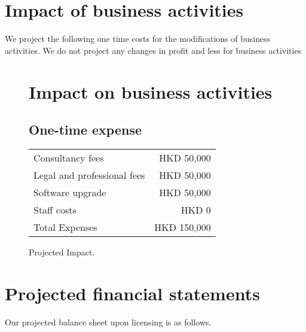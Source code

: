 \section{Impact of business activities}

We project the following one time costs for the modifications of
business activities.  We do not project any changes in profit and less
for business activities

\begin{figure}[h]
  \centering
  \caption{Projected Impact.}
  \label{fig:financial_statement}
  
  \section*{Impact on business activities}
  
  \subsection*{One-time expense}
  \begin{tabular}{lr}
    Consultancy fees & HKD 50,000 \\
    Legal and professional fees & HKD 50,000 \\
    Software upgrade & HKD 50,000 \\
    Staff costs & HKD 0 \\
    \midrule
    Total Expenses & HKD 150,000 \\
  \end{tabular}
\end{figure}


\section{Projected financial statements}

Our projected balance sheet upon licensing is as follows.

